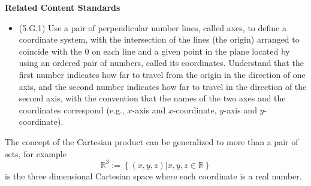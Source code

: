 \documentclass[
]{book}
\providecommand{\tightlist}{%
  \setlength{\itemsep}{0pt}\setlength{\parskip}{0pt}}
\newenvironment{standards}{}{}
\theoremstyle{definition}
\theoremstyle{definition}
\theoremstyle{definition}
\theoremstyle{definition}
\theoremstyle{remark}
\begin{document}
\begin{standards}

\begin{center}
\textbf{Related Content Standards}

\end{center}

\begin{itemize}
\tightlist
\item
  (5.G.1) Use a pair of perpendicular number lines, called axes, to define a coordinate system, with the intersection of the lines (the origin) arranged to coincide with the \(0\) on each line and a given point in the plane located by using an ordered pair of numbers, called its coordinates. Understand that the first number indicates how far to travel from the origin in the direction of one axis, and the second number indicates how far to travel in the direction of the second axis, with the convention that the names of the two axes and the coordinates correspond (e.g., \(x\)-axis and \(x\)-coordinate, \(y\)-axis and \(y\)-coordinate).
\end{itemize}

\end{standards}

The concept of the Cartesian product can be generalized to more than a pair of sets, for example \[\mathbb{R}^3:= \left\{ (x,y,z) \vert x,y,z\in \mathbb{R} \right\}\] is the three dimensional Cartesian space where each coordinate is a real number.
\end{document}
